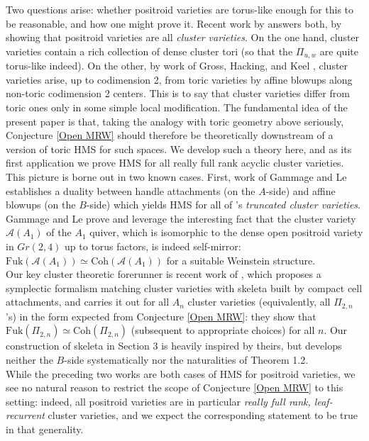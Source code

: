 \documentclass[11pt]{amsart}
\theoremstyle{definition}
\theoremstyle{remark}
\newcommand{\Coh}{\mathrm{Coh}}
\newcommand{\Fuk}{\mathrm{Fuk}}
\numberwithin{equation}{section}
\begin{document}
Two questions arise: whether positroid varieties are torus-like enough for this to be reasonable, and how one might prove it. Recent work by \cite{GaLa} answers both, by showing that positroid varieties are all \textit{cluster varieties}. On the one hand, cluster varieties contain a rich collection of dense cluster tori (so that the $\Pi_{u,w}$ are quite torus-like indeed). On the other, by work of Gross, Hacking, and Keel \cite{GHK}, cluster varieties arise, up to codimension 2, from toric varieties by affine blowups along non-toric codimension 2 centers. This is to say that cluster varieties differ from toric ones only in some simple local modification. The fundamental idea of the present paper is that, taking the analogy with toric geometry above seriously, Conjecture \ref{Open MRW} should therefore be theoretically downstream of a version of toric HMS for such spaces. We develop such a theory here, and as its first application we prove HMS for all really full rank acyclic cluster varieties.\\

This picture is borne out in two known cases. First, work of Gammage and Le \cite{GL} establishes a duality between handle attachments (on the $A$-side) and affine blowups (on the $B$-side) which yields HMS for all of \cite{GHK}'s \textit{truncated cluster varieties}. Gammage and Le prove and leverage the interesting fact that the cluster variety $\mathcal{A}(A_1)$ of the $A_1$ quiver, which is isomorphic to the dense open positroid variety in $Gr(2,4)$ up to torus factors, is indeed self-mirror: $\Fuk(\mathcal{A}(A_1)) \simeq \Coh(\mathcal{A}(A_1))$ for a suitable Weinstein structure.\\

Our key cluster theoretic forerunner is recent work of \cite{SSWZ}, which proposes a symplectic formalism matching cluster varieties with skeleta built by compact cell attachments, and carries it out for all $A_n$ cluster varieties (equivalently, all $\Pi_{2,n}$’s) in the form expected from Conjecture \ref{Open MRW}: they show that $\Fuk(\Pi_{2,n}) \simeq \Coh(\Pi_{2,n})$ (subsequent to appropriate choices) for all $n$. Our construction of skeleta in Section 3 is heavily inspired by theirs, but \cite{SSWZ} develops neither the $B$-side systematically nor the naturalities of Theorem 1.2.\\

While the preceding two works are both cases of HMS for positroid varieties, we see no natural reason to restrict the scope of Conjecture \ref{Open MRW} to this setting: indeed, all positroid varieties are in particular \textit{really full rank, leaf-recurrent} cluster varieties, and we expect the corresponding statement to be true in that generality.
\end{document}
